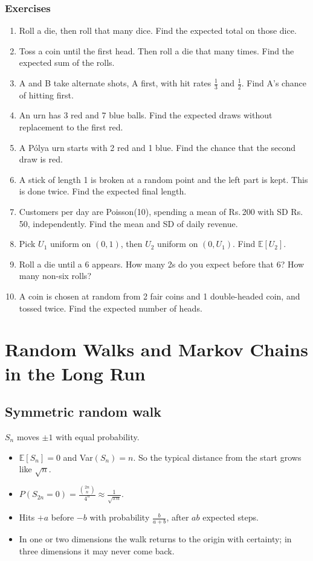 \documentclass[11pt,a4paper,openany]{report}
\newenvironment{exercises}{\subsection*{Exercises \thechapter}\begin{enumerate}[label=\textbf{\thechapter.\arabic*},leftmargin=3.2em]}{\end{enumerate}}
\newcommand{\C}[2]{\binom{#1}{#2}}
\newcommand{\Rs}{Rs.\,}
\newcommand{\E}{\mathbb{E}}
\begin{document}
\begin{exercises}
\item Roll a die, then roll that many dice. Find the expected total on those dice.
\item Toss a coin until the first head. Then roll a die that many times. Find the expected sum of the rolls.
\item A and B take alternate shots, A first, with hit rates $\frac13$ and $\frac12$. Find A's chance of hitting first.
\item An urn has 3 red and 7 blue balls. Find the expected draws without replacement to the first red.
\item A P\'olya urn starts with 2 red and 1 blue. Find the chance that the second draw is red.
\item A stick of length 1 is broken at a random point and the left part is kept. This is done twice. Find the expected final length.
\item Customers per day are Poisson(10), spending a mean of \Rs200 with SD \Rs50, independently. Find the mean and SD of daily revenue.
\item Pick $U_1$ uniform on $(0,1)$, then $U_2$ uniform on $(0,U_1)$. Find $\E[U_2]$.
\item Roll a die until a 6 appears. How many 2s do you expect before that 6? How many non-six rolls?
\item A coin is chosen at random from 2 fair coins and 1 double-headed coin, and tossed twice. Find the expected number of heads.
\end{exercises}

\chapter{Random Walks and Markov Chains in the Long Run}\label{ch:walk}

\section{Symmetric random walk}
$S_n$ moves $\pm1$ with equal probability.
\begin{itemize}[nosep]
\item $\E[S_n]=0$ and Var$(S_n)=n$. So the typical distance from the start grows like $\sqrt n$.
\item $P(S_{2n}=0)=\frac{\C{2n}n}{4^n}\approx\frac1{\sqrt{\pi n}}$.
\item Hits $+a$ before $-b$ with probability $\frac b{a+b}$, after $ab$ expected steps.
\item In one or two dimensions the walk returns to the origin with certainty; in three dimensions it may never come back.
\end{itemize}
\end{document}
